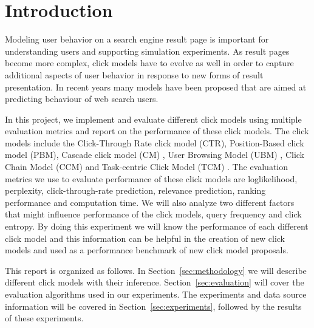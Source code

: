 \section{Introduction}
Modeling user behavior on a search engine result page is important for understanding users and supporting simulation experiments.
As result pages become more complex, click models have to evolve as well in order to capture additional aspects of user behavior in response to new forms of result presentation.
In recent years many models have been proposed that are aimed at predicting behaviour of web search users. 

In this project, we implement and evaluate different click models using multiple evaluation metrics and report on the performance of these click models.
The click models include the Click-Through Rate click model (CTR), Position-Based click model (PBM), Cascade click model (CM) \cite{Kempe2008}, User Browsing Model (UBM) \cite{Dupret2008}, Click Chain Model (CCM) \cite{Guo2009_CCM} and Task-centric Click Model (TCM) \cite{Zhang2011}.
The evaluation metrics we use to evaluate performance of these click models are loglikelihood, perplexity, click-through-rate prediction, relevance prediction, ranking performance and computation time. We will also analyze two different factors that might influence performance of the click models, query frequency and click entropy.
By doing this experiment we will know the performance of each different click model and this information can be helpful in the creation of new click models and used as a performance benchmark of new click model proposals.

This report is organized as follows.
In Section~\ref{sec:methodology} we will describe different click models with their inference. Section~\ref{sec:evaluation} will cover the evaluation algorithms used in our experiments. The experiments and data source information will be covered in Section~\ref{sec:experiments}, followed by the results of these experiments.
